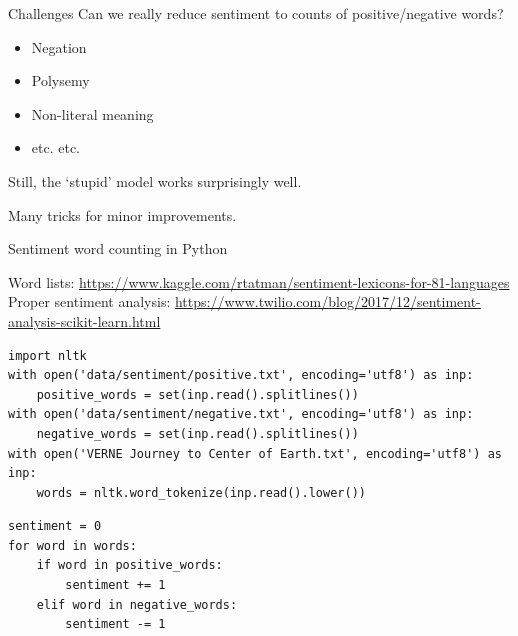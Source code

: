 \documentclass[aspectratio=169,usenames,dvipsnames]{beamer}
\begin{document}
\begin{frame}{Challenges}
    Can we really reduce sentiment to counts of positive/negative words?

    \begin{itemize}
        \item Negation
        \item Polysemy
        \item Non-literal meaning
        \item etc. etc.
    \end{itemize}

	\vspace{1em}
    Still, the `stupid' model works surprisingly well.

    Many tricks for minor improvements.
\end{frame}

\begin{frame}[fragile]{Sentiment word counting in Python}
    \begin{reference}\scriptsize
        Word lists: \url{https://www.kaggle.com/rtatman/sentiment-lexicons-for-81-languages} \\
        Proper sentiment analysis: \url{https://www.twilio.com/blog/2017/12/sentiment-analysis-scikit-learn.html}
    \end{reference}
\begin{lstlisting}[style=smaller]
import nltk
with open('data/sentiment/positive.txt', encoding='utf8') as inp:
    positive_words = set(inp.read().splitlines())
with open('data/sentiment/negative.txt', encoding='utf8') as inp:
    negative_words = set(inp.read().splitlines())
with open('VERNE Journey to Center of Earth.txt', encoding='utf8') as inp:
    words = nltk.word_tokenize(inp.read().lower())
\end{lstlisting}
\pause\vspace{-1em}
\begin{lstlisting}[style=smaller]
sentiment = 0
for word in words:
    if word in positive_words:
        sentiment += 1
    elif word in negative_words:
        sentiment -= 1
\end{lstlisting}
\end{frame}
\end{document}
